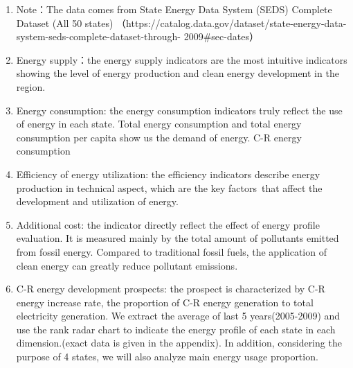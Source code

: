\documentclass{mcmthesis}
\begin{document}
\begin{enumerate}
        \item Note：The data comes from State Energy Data System (SEDS) Complete Dataset (All 50 states) （https://catalog.data.gov/dataset/state-energy-data-system-seds-complete-dataset-through- 2009\#sec-dates）
        \item Energy supply：the energy supply indicators are the most intuitive indicators showing the level of energy production and clean energy development in the region.
        \item Energy consumption: the energy consumption indicators truly reflect the use of energy in each state. Total energy consumption and total energy consumption per capita show us the demand of energy. C-R energy consumption
        \item Efficiency of energy utilization: the efficiency indicators describe energy production in technical aspect, which are the key factors that affect the development and utilization of  energy.
        \item Additional cost: the indicator directly reflect the effect of energy profile evaluation. It is measured mainly by the total amount of pollutants emitted from fossil energy. Compared to traditional fossil fuels, the application of clean energy can greatly reduce pollutant emissions.
        \item C-R energy development prospects: the prospect is characterized by C-R energy increase rate, the proportion of C-R energy generation to total electricity generation.
        We extract the average of last 5 years(2005-2009) and use the rank radar chart to indicate the energy profile of each state in each dimension.(exact data is given in the appendix). In addition, considering the purpose of 4 states, we will also analyze main energy usage proportion.
        \end{enumerate}
\end{document}
